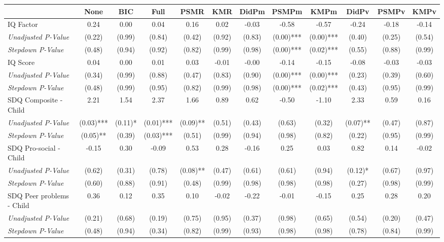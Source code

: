 \begin{tabular}{l c c c c c c c c c c c}
\toprule
 & None & BIC & Full & PSMR & KMR & DidPm & PSMPm & KMPm & DidPv & PSMPv & KMPv \\
\midrule
IQ Factor & 0.24 & 0.00 & 0.04 & 0.16 & 0.02 & -0.03 & -0.58 & -0.57 & -0.24 & -0.18 & -0.14 \\
\quad \textit{Unadjusted P-Value} & (0.22) & (0.99) & (0.84) & (0.42) & (0.92) & (0.83) & (0.00)*** & (0.00)*** & (0.40) & (0.25) & (0.54) \\
\quad \textit{Stepdown P-Value} & (0.48) & (0.94) & (0.92) & (0.82) & (0.99) & (0.98) & (0.00)*** & (0.02)*** & (0.55) & (0.88) & (0.99) \\
IQ Score & 0.04 & 0.00 & 0.01 & 0.03 & -0.01 & -0.00 & -0.14 & -0.15 & -0.08 & -0.03 & -0.03 \\
\quad \textit{Unadjusted P-Value} & (0.34) & (0.99) & (0.88) & (0.47) & (0.83) & (0.90) & (0.00)*** & (0.00)*** & (0.23) & (0.39) & (0.60) \\
\quad \textit{Stepdown P-Value} & (0.48) & (0.99) & (0.95) & (0.82) & (0.99) & (0.98) & (0.00)*** & (0.02)*** & (0.43) & (0.95) & (0.99) \\
SDQ Composite - Child & 2.21 & 1.54 & 2.37 & 1.66 & 0.89 & 0.62 & -0.50 & -1.10 & 2.33 & 0.59 & 0.16 \\
\quad \textit{Unadjusted P-Value} & (0.03)*** & (0.11)* & (0.01)*** & (0.09)** & (0.51) & (0.43) & (0.63) & (0.32) & (0.07)** & (0.47) & (0.87) \\
\quad \textit{Stepdown P-Value} & (0.05)** & (0.39) & (0.03)*** & (0.51) & (0.99) & (0.94) & (0.98) & (0.82) & (0.22) & (0.95) & (0.99) \\
SDQ Pro-social - Child & -0.15 & 0.30 & -0.09 & 0.53 & 0.28 & -0.16 & 0.25 & 0.03 & 0.82 & 0.14 & -0.02 \\
\quad \textit{Unadjusted P-Value} & (0.62) & (0.31) & (0.78) & (0.08)** & (0.47) & (0.61) & (0.61) & (0.94) & (0.12)* & (0.67) & (0.97) \\
\quad \textit{Stepdown P-Value} & (0.60) & (0.88) & (0.91) & (0.48) & (0.99) & (0.98) & (0.98) & (0.98) & (0.27) & (0.98) & (0.99) \\
SDQ Peer problems - Child & 0.36 & 0.12 & 0.35 & 0.10 & -0.02 & -0.22 & -0.01 & -0.15 & 0.25 & 0.28 & 0.20 \\
\quad \textit{Unadjusted P-Value} & (0.21) & (0.68) & (0.19) & (0.75) & (0.95) & (0.37) & (0.98) & (0.65) & (0.54) & (0.20) & (0.47) \\
\quad \textit{Stepdown P-Value} & (0.48) & (0.94) & (0.34) & (0.82) & (0.99) & (0.93) & (0.98) & (0.98) & (0.78) & (0.84) & (0.99) \\

\end{tabular}
